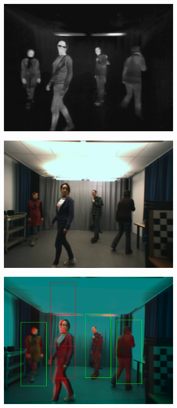 \begin{figure}[h]
\centering
\begin{subfigure}{0.32\textwidth}
\centering
\includegraphics[width=0.9\linewidth]{images/sampleIR}
\subcaption{\label{fig:sampleIR}}
\end{subfigure}
\begin{subfigure}{0.32\textwidth}
\centering
\includegraphics[width=0.9\linewidth]{images/sampleRGB}
\subcaption{\label{fig:sampleRGB}}
\end{subfigure}
\begin{subfigure}{0.32\textwidth}
\centering
\includegraphics[width=0.9\linewidth]{images/sampleHOGSVM}
\subcaption{\label{fig:sampleHOGSVM}}
\end{subfigure}


\end{figure}
